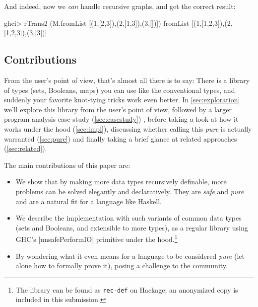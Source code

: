 \documentclass[manuscript,anonymous,screen,acmsmall]{acmart}
\begin{document}
And indeed, now we \emph{can} handle recursive graphs, and get the correct result:
\begin{code}
ghci> rTrans2 (M.fromList [(1,[2,3]),(2,[1,3]),(3,[])])
fromList [(1,[1,2,3]),(2,[1,2,3]),(3,[3])]
\end{code}

\subsection{Contributions}

From the user’s point of view, that’s almost all there is  to say: There is a library of types (sets, Booleans, maps) you can use like the conventional types, and suddenly your favorite knot-tying tricks work even better. In \cref{sec:exploration} we'll explore this library from the user's point of view, followed by a larger program analysis case-study (\cref{sec:casestudy}) , before taking a look at how it works under the hood (\cref{sec:impl}), discussing whether calling this \emph{pure} is actually warranted (\cref{sec:pure}) and finally taking a brief glance at related approaches (\cref{sec:related}).

\medskip

The main contributions of this paper are:

\begin{itemize}
\item We show that by making more data types recursively definable, more problems can be solved elegantly and declaratively. They are \emph{safe} and \emph{pure} and are a natural fit for a language like Haskell.

\item We describe the implementation with such variants of common data types (sets and Booleans, and extensible to more types), as a regular library using GHC's |unsafePerformIO| primitive under the hood.\footnote{The library can be found as \texttt{rec-def} on Hackage; an anonymized copy is included in this submission.}

\item By wondering what it even means for a language to be considered \emph{pure} (let alone how to formally prove it), posing a challenge to the community.

\end{itemize}
\end{document}
